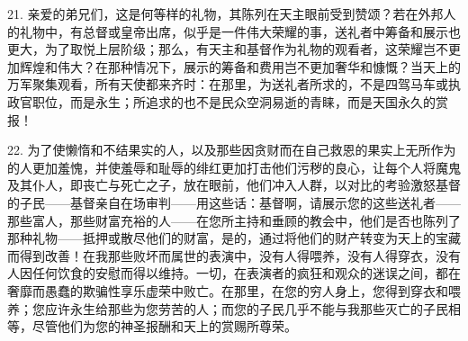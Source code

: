 21. 亲爱的弟兄们，这是何等样的礼物，其陈列在天主眼前受到赞颂？若在外邦人的礼物中，有总督或皇帝出席，似乎是一件伟大荣耀的事，送礼者中筹备和展示也更大，为了取悦上层阶级；那么，有天主和基督作为礼物的观看者，这荣耀岂不更加辉煌和伟大？在那种情况下，展示的筹备和费用岂不更加奢华和慷慨？当天上的万军聚集观看，所有天使都来齐时：在那里，为送礼者所求的，不是四驾马车或执政官职位，而是永生；所追求的也不是民众空洞易逝的青睐，而是天国永久的赏报！\par

22. 为了使懒惰和不结果实的人，以及那些因贪财而在自己救恩的果实上无所作为的人更加羞愧，并使羞辱和耻辱的绯红更加打击他们污秽的良心，让每个人将魔鬼及其仆人，即丧亡与死亡之子，放在眼前，他们冲入人群，以对比的考验激怒基督的子民——基督亲自在场审判——用这些话：基督啊，请展示您的这些送礼者——那些富人，那些财富充裕的人——在您所主持和垂顾的教会中，他们是否也陈列了那种礼物——抵押或散尽他们的财富，是的，通过将他们的财产转变为天上的宝藏而得到改善！在我那些败坏而属世的表演中，没有人得喂养，没有人得穿衣，没有人因任何饮食的安慰而得以维持。一切，在表演者的疯狂和观众的迷误之间，都在奢靡而愚蠢的欺骗性享乐虚荣中败亡。在那里，在您的穷人身上，您得到穿衣和喂养；您应许永生给那些为您劳苦的人；而您的子民几乎不能与我那些灭亡的子民相等，尽管他们为您的神圣报酬和天上的赏赐所尊荣。\par

